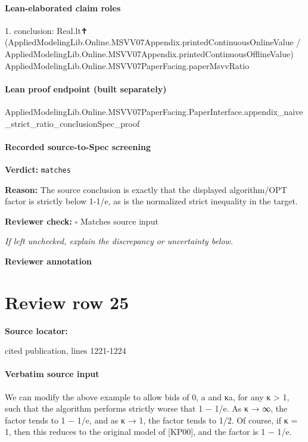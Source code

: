 \documentclass[10pt]{article}
\newcommand{\reviewerbox}{%
  \par\noindent\fbox{\parbox{0.96\linewidth}{\rule{0pt}{0.38in}}}\par
}
\newcommand{\reviewmatch}[1]{%
  \par\noindent\textbf{Reviewer check:} $\square$\; #1\par
  \noindent\emph{If left unchecked, explain the discrepancy or uncertainty below.}\par
}
\begin{document}
\paragraph{Lean-elaborated claim roles}\begin{ReviewVerbatim}
1. conclusion: Real.lt✝
  (AppliedModelingLib.Online.MSVV07Appendix.printedContinuousOnlineValue /
    AppliedModelingLib.Online.MSVV07Appendix.printedContinuousOfflineValue)
  AppliedModelingLib.Online.MSVV07PaperFacing.paperMsvvRatio
\end{ReviewVerbatim}

\paragraph{Lean proof endpoint (built separately)}\begin{ReviewVerbatim}
AppliedModelingLib.Online.MSVV07PaperFacing.PaperInterface.appendix_naive_strict_ratio_conclusionSpec_proof
\end{ReviewVerbatim}

\paragraph{Recorded source-to-Spec screening}
\textbf{Verdict:} \texttt{matches}
\\
{\raggedright
\textbf{Reason:} The source conclusion is exactly that the displayed algorithm/\allowbreak{}OPT factor is strictly below 1-\allowbreak{}1/\allowbreak{}e, as is the normalized strict inequality in the target.\allowbreak{}
\par}
\reviewmatch{Matches source input}
\noindent\textbf{Reviewer annotation}\par
\reviewerbox
\clearpage
\hypertarget{source-claim-694106c40dd0af51}{}
\section*{Review row 25}
\textbf{Source locator:} {\footnotesize\raggedright cited publication, lines 1221-\allowbreak{}1224\par}
\paragraph{Verbatim source input}
\begin{ReviewVerbatim}
We can modify the above example to allow bids of 0, a and κa, for any κ > 1, such that the
algorithm performs strictly worse that 1 − 1/e.
As κ → ∞, the factor tends to 1 − 1/e, and as κ → 1, the factor tends to 1/2. Of course, if
κ = 1, then this reduces to the original model of [KP00], and the factor is 1 − 1/e.
\end{ReviewVerbatim}
\end{document}
